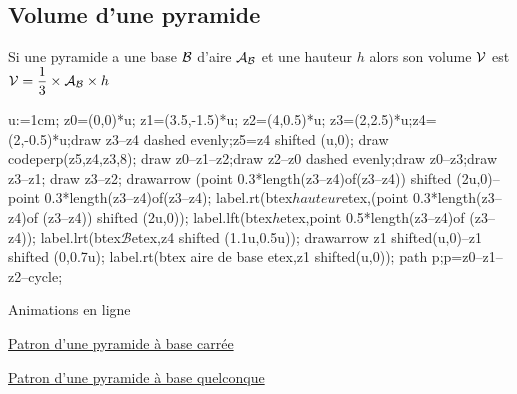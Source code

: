 \subsection{Volume d'une pyramide}
\begin{propriete}[\admise]
    Si une pyramide a une base $\cal B$ d'aire ${\cal A}_{\cal B}$ et une hauteur $h$ alors son volume $\cal V$ est ${\cal V}=\dfrac13\times{\cal A}_{\cal B}\times h$
    \begin{center}
        \begin{Geometrie}[CoinBG={(-4u,-2.5u)}]
            u:=1cm;
            z0=(0,0)*u;
            z1=(3.5,-1.5)*u;
            z2=(4,0.5)*u;
            z3=(2,2.5)*u;z4=(2,-0.5)*u;draw z3--z4 dashed evenly;z5=z4 shifted (u,0);
            draw codeperp(z5,z4,z3,8);
            draw z0--z1--z2;draw z2--z0 dashed evenly;draw z0--z3;draw z3--z1; draw z3--z2;
            drawarrow (point 0.3*length(z3--z4)of(z3--z4)) shifted (2u,0)--point 0.3*length(z3--z4)of(z3--z4);
            label.rt(btex$hauteur$etex,(point 0.3*length(z3--z4)of (z3--z4)) shifted (2u,0));
            label.lft(btex$h$etex,point 0.5*length(z3--z4)of (z3--z4));
            label.lrt(btex$\mathcal{B}$etex,z4 shifted (1.1u,0.5u));
            drawarrow z1 shifted(u,0)--z1 shifted (0,0.7u);
            label.rt(btex aire de base etex,z1 shifted(u,0));
            path p;p=z0--z1--z2--cycle;
        \end{Geometrie}
    \end{center}
\end{propriete}


\begin{center}
    \begin{myBox}{  Animations en ligne}
        \begin{flushleft}        
            \href{http://lozano.maths.free.fr/iep_local/figures_html/scr_iep_130.html}{ Patron d'une pyramide à base carrée}

            \href{http://lozano.maths.free.fr/iep_local/figures_html/scr_iep_148.html}{ Patron d'une pyramide à base quelconque}
        \end{flushleft}
    
        \creditInstrumentPoche
    \end{myBox}
\end{center}

